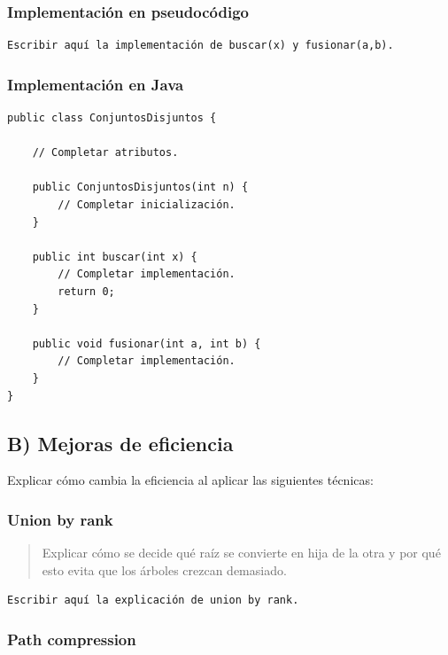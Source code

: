 \documentclass[11pt]{article}
\begin{document}
\subsubsection{Implementación en pseudocódigo}
\label{sec:org006d89d}

\begin{verbatim}
Escribir aquí la implementación de buscar(x) y fusionar(a,b).
\end{verbatim}

\subsubsection{Implementación en Java}
\label{sec:orgc894545}

\begin{verbatim}
public class ConjuntosDisjuntos {

    // Completar atributos.

    public ConjuntosDisjuntos(int n) {
        // Completar inicialización.
    }

    public int buscar(int x) {
        // Completar implementación.
        return 0;
    }

    public void fusionar(int a, int b) {
        // Completar implementación.
    }
}
\end{verbatim}

\subsection{B) Mejoras de eficiencia}
\label{sec:orga0b4196}

Explicar cómo cambia la eficiencia al aplicar las siguientes técnicas:

\subsubsection{Union by rank}
\label{sec:org0f6bac9}

\begin{quote}
Explicar cómo se decide qué raíz se convierte en hija de la otra y por qué esto evita que los árboles crezcan demasiado.
\end{quote}

\begin{verbatim}
Escribir aquí la explicación de union by rank.
\end{verbatim}

\subsubsection{Path compression}
\label{sec:org72484a3}
\end{document}
